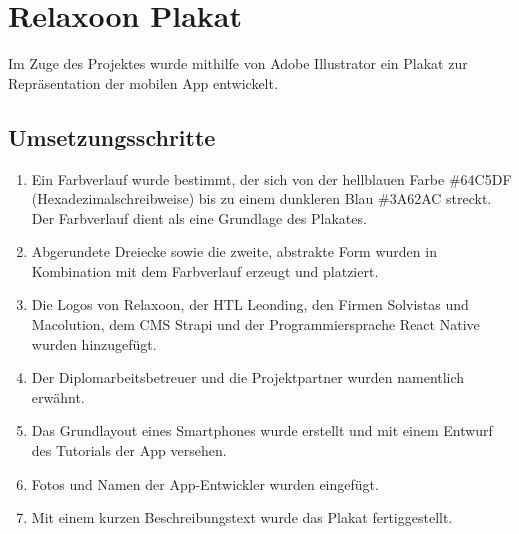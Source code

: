 \begin{spacing}{1}
\begin{quotation}
    \end{quotation}


    \section{Relaxoon Plakat}\label{sec:plakat}

    Im Zuge des Projektes wurde mithilfe von Adobe Illustrator ein Plakat zur Repräsentation der mobilen App
    entwickelt. 

    \subsection{Umsetzungsschritte}

    \begin{enumerate}
        \item Ein Farbverlauf wurde bestimmt, der sich von der hellblauen Farbe \#64C5DF (Hexadezimalschreibweise)
        bis zu einem dunkleren Blau \#3A62AC streckt. Der Farbverlauf dient als eine Grundlage des Plakates.
        \item Abgerundete Dreiecke sowie die zweite, abstrakte Form wurden in Kombination mit dem Farbverlauf erzeugt und platziert.
        \item Die Logos von Relaxoon, der HTL Leonding, den Firmen Solvistas und Macolution, dem CMS Strapi und der Programmiersprache React Native wurden hinzugefügt.
        \item Der Diplomarbeitsbetreuer und die Projektpartner wurden namentlich erwähnt.
        \item Das Grundlayout eines Smartphones wurde erstellt und mit einem Entwurf des Tutorials der App versehen.
        \item Fotos und Namen der App-Entwickler wurden eingefügt.
        \item Mit einem kurzen Beschreibungstext wurde das Plakat fertiggestellt.
      \end{enumerate}



\end{spacing}

